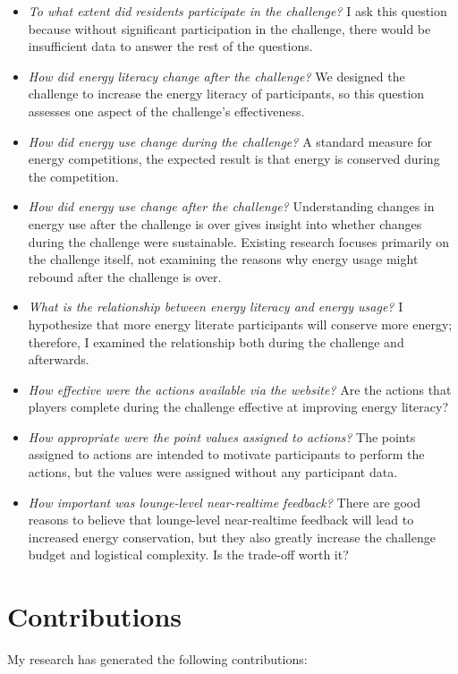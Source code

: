 \begin{itemize}
	\item \emph{To what extent did residents participate in the challenge?} I ask this question because without significant participation in the challenge, there would be insufficient data to answer the rest of the questions.
	\item \emph{How did energy literacy change after the challenge?} We designed the challenge to increase the energy literacy of participants, so this question assesses one aspect of the challenge's effectiveness.
	\item \emph{How did energy use change during the challenge?} A standard measure for energy competitions, the expected result is that energy is conserved during the competition.
	\item \emph{How did energy use change after the challenge?} Understanding changes in energy use after the challenge is over gives insight into whether changes during the challenge were sustainable. Existing research focuses primarily on the challenge itself, not examining the reasons why energy usage might rebound after the challenge is over.
	\item \emph{What is the relationship between energy literacy and energy usage?} I hypothesize that more energy literate participants will conserve more energy; therefore, I examined the relationship both during the challenge and afterwards.
	\item \emph{How effective were the \emph{actions} available via the website?} Are the actions that players complete during the challenge effective at improving energy literacy?
	\item \emph{How appropriate were the point values assigned to actions?} The points assigned to actions are intended to motivate participants to perform the actions, but the values were assigned without any participant data.
	\item \emph{How important was lounge-level near-realtime feedback?} There are good reasons to believe that lounge-level near-realtime feedback will lead to increased energy conservation, but they also greatly increase the challenge budget and logistical complexity. Is the trade-off worth it?
\end{itemize}


\section{Contributions}

My research has generated the following contributions:


